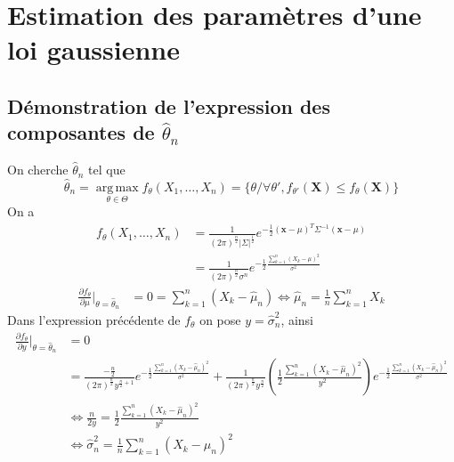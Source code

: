 \documentclass{report}
\begin{document}
	\section{Estimation des paramètres d'une loi gaussienne}
		\subsection{Démonstration de l'expression des composantes de $\hat{\theta}_n$}
			On cherche $\hat{\theta}_n$ tel que
			\[ \hat{\theta}_n = \operatorname*{arg\,max}_{\theta \in \Theta} f_\theta(X_1, \ldots, X_n) = \{ \theta / \forall \theta', f_{\theta'}(\textbf{X}) \leq f_{\theta}(\textbf{X}) \} \]
			On a
			\begin{align*}
				f_\theta(X_1, \ldots, X_n) &= \frac{1}{(2\pi)^\frac{n}{2}|\Sigma|^\frac{1}{2}}e^{-\frac{1}{2}(\textbf{x}-\mu)^T\Sigma^{-1}(\textbf{x}-\mu)}\\
				&= \frac{1}{(2\pi)^\frac{n}{2}\sigma^n}e^{-\frac{1}{2}\frac{\sum\limits_{k=1}^n (X_k - \mu)^2}{\sigma^2}}
			\end{align*}
			\begin{align*}
				\frac{\partial f_\theta}{\partial\mu}|_{\theta = \hat{\theta}_n} &= 0 = \sum\limits_{k=1}^n (X_k - \hat{\mu}_n) \Leftrightarrow \hat{\mu}_n = \frac{1}{n}\sum\limits_{k=1}^n X_k
			\end{align*}
			Dans l'expression précédente de $f_\theta$ on pose $y = \hat{\sigma}^2_n$, ainsi
			\begin{align*}
				\frac{\partial f_\theta}{\partial y}|_{\theta = \hat{\theta}_n} &= 0 \\
				&= \frac{-\frac{n}{2}}{(2\pi)^{\frac{n}{2}}y^{\frac{n}{2}+1}}e^{-\frac{1}{2}\frac{\sum\limits_{k=1}^n (X_k - \hat{\mu}_n)^2}{\sigma^2}} + \frac{1}{(2\pi)^{\frac{n}{2}}y^{\frac{n}{2}}}\left( \frac{1}{2}\frac{\sum\limits_{k=1}^n (X_k - \hat{\mu}_n)^2}{y^2} \right)e^{-\frac{1}{2}\frac{\sum\limits_{k=1}^n (X_k - \hat{\mu}_n)^2}{\sigma^2}}\\
				&\Leftrightarrow \frac{n}{2y} = \frac{1}{2}\frac{\sum\limits_{k=1}^n (X_k - \hat{\mu}_n)^2}{y^2} \\
				&\Leftrightarrow \hat{\sigma}^2_n = \frac{1}{n} \sum\limits_{k=1}^n (X_k - \hat{\mu}_n)^2
			\end{align*}
\end{document}
